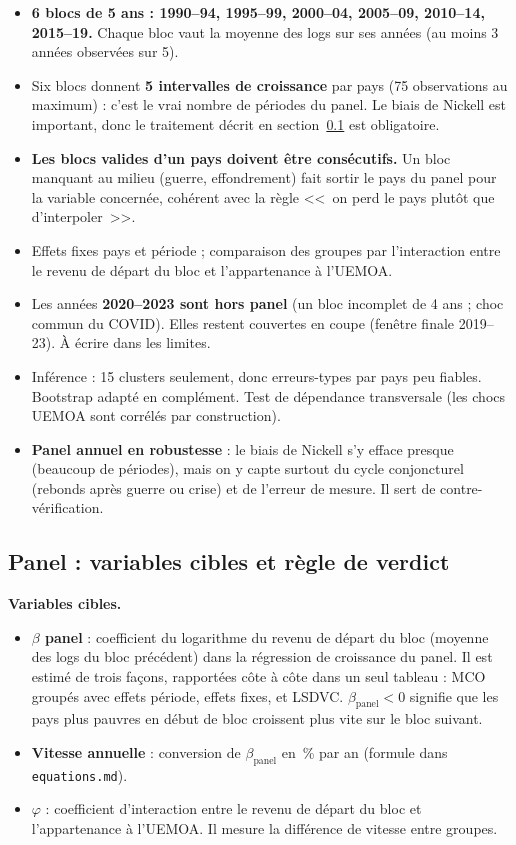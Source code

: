 \documentclass[14pt,a4paper]{article}
\newcommand{\bet}{\texorpdfstring{$\beta$}{beta}}
\begin{document}
	\begin{itemize}
		\item \textbf{6 blocs de 5 ans : 1990--94, 1995--99, 2000--04, 2005--09, 2010--14, 2015--19.} Chaque bloc vaut la moyenne des logs sur ses années (au moins 3 années observées sur 5).
		\item Six blocs donnent \textbf{5 intervalles de croissance} par pays (75 observations au maximum) : c'est le vrai nombre de périodes du panel. Le biais de Nickell est important, donc le traitement décrit en section~\ref{sec:verdict-panel} est obligatoire.
		\item \textbf{Les blocs valides d'un pays doivent être consécutifs.} Un bloc manquant au milieu (guerre, effondrement) fait sortir le pays du panel pour la variable concernée, cohérent avec la règle <<~on perd le pays plutôt que d'interpoler~>>.
		\item Effets fixes pays et période ; comparaison des groupes par l'interaction entre le revenu de départ du bloc et l'appartenance à l'UEMOA.
		\item Les années \textbf{2020--2023 sont hors panel} (un bloc incomplet de 4 ans ; choc commun du COVID). Elles restent couvertes en coupe (fenêtre finale 2019--23). À écrire dans les limites.
		\item Inférence : 15 clusters seulement, donc erreurs-types par pays peu fiables. Bootstrap adapté en complément. Test de dépendance transversale (les chocs UEMOA sont corrélés par construction).
		\item \textbf{Panel annuel en robustesse} : le biais de Nickell s'y efface presque (beaucoup de périodes), mais on y capte surtout du cycle conjoncturel (rebonds après guerre ou crise) et de l'erreur de mesure. Il sert de contre-vérification.
	\end{itemize}
	
	\subsection{Panel : variables cibles et règle de verdict}
	\label{sec:verdict-panel}
	
	\textbf{Variables cibles.}
	\begin{itemize}
		\item \textbf{\boldmath\bet{} panel} : coefficient du logarithme du revenu de départ du bloc (moyenne des logs du bloc précédent) dans la régression de croissance du panel. Il est estimé de trois façons, rapportées côte à côte dans un seul tableau : MCO groupés avec effets période, effets fixes, et LSDVC. $\beta_{\text{panel}} < 0$ signifie que les pays plus pauvres en début de bloc croissent plus vite sur le bloc suivant.
		\item \textbf{Vitesse annuelle} : conversion de $\beta_{\text{panel}}$ en \,\% par an (formule dans \texttt{equations.md}).
		\item \textbf{\boldmath$\varphi$} : coefficient d'interaction entre le revenu de départ du bloc et l'appartenance à l'UEMOA. Il mesure la différence de vitesse entre groupes.
	\end{itemize}
	
\end{document}
